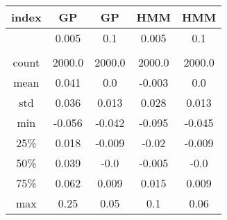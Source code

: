 \centering \begin{tabular}{c|c|c|c|c}
index	&GP	&GP	&HMM	&HMM\\\hline
	&0.005	&0.1	&0.005	&0.1\\
	&	&	&	&\\
count	&2000.0	&2000.0	&2000.0	&2000.0\\
mean	&0.041	&0.0	&-0.003	&0.0\\
std	&0.036	&0.013	&0.028	&0.013\\
min	&-0.056	&-0.042	&-0.095	&-0.045\\
25\%	&0.018	&-0.009	&-0.02	&-0.009\\
50\%	&0.039	&-0.0	&-0.005	&-0.0\\
75\%	&0.062	&0.009	&0.015	&0.009\\
max	&0.25	&0.05	&0.1	&0.06\\
\end{tabular}
